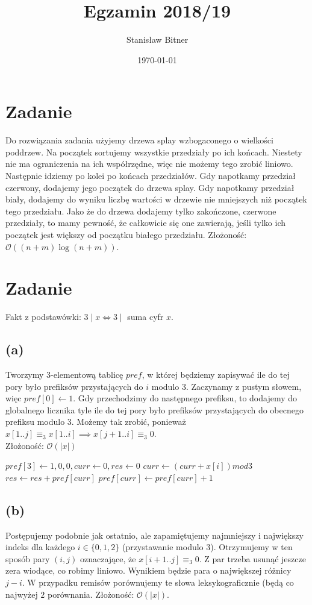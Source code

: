 \documentclass[12pt, a4paper]{article}
\title{Egzamin 2018/19}
\author{Stanisław Bitner}
\date{\today}
\newcommand{\MCALO}{\mathcal{O}}
\newcounter{zadanie}
\newcommand{\zadanie}{\addtocounter{zadanie}{1}\section*{Zadanie \arabic{zadanie}}}
\begin{document}
\maketitle
\zadanie{}
Do rozwiązania zadania użyjemy drzewa splay wzbogaconego o wielkości poddrzew.
Na początek sortujemy wszystkie przedziały po ich końcach. Niestety nie ma
ograniczenia na ich współrzędne, więc nie możemy tego zrobić liniowo. Następnie
idziemy po kolei po końcach przedziałów. Gdy napotkamy przedział czerwony,
dodajemy jego początek do drzewa splay. Gdy napotkamy przedział biały, dodajemy
do wyniku liczbę wartości w drzewie nie mniejszych niż początek tego
przedziału. Jako że do drzewa dodajemy tylko zakończone, czerwone przedziały,
to mamy pewność, że całkowicie się one zawierają, jeśli tylko ich początek jest
większy od początku białego przedziału. Złożoność: $\MCALO((n+m)\log{(n+m)})$.

\zadanie{}
Fakt z podstawówki: $3 \mid x \iff 3 \mid $ suma cyfr $x$.
\subsection*{(a)}
Tworzymy $3$-elementową tablicę $\mathit{pref}$, w której będziemy zapisywać
ile do tej pory było prefiksów przystających do $i$ modulo $3$. Zaczynamy
z pustym słowem, więc $pref[0] \gets 1$. Gdy przechodzimy do następnego
prefiksu, to dodajemy do globalnego licznika tyle ile do tej pory było
prefiksów przystających do obecnego prefiksu modulo $3$. Możemy tak zrobić,
ponieważ $x[1..j] \equiv_3 x[1..i] \implies x[j+1..i] \equiv_3 0$.\\
Złożoność: $\MCALO(|x|)$

\begin{algorithmic}

  \State $pref[3] \gets {1,0,0}, curr \gets 0, res \gets 0$
    \State $curr \gets (curr + x[i]) mod 3$
    \State $res \gets res + pref[curr]$
    \State $pref[curr] \gets pref[curr] + 1$
  \EndFor
\EndFunction

\end{algorithmic}

\subsection*{(b)}
Postępujemy podobnie jak ostatnio, ale zapamiętujemy najmniejszy i największy
indeks dla każdego $i\in\{0,1,2\}$ (przystawanie modulo $3$). Otrzymujemy
w ten sposób pary $(i,j)$ oznaczające, że $x[i+1..j] \equiv_3 0$. Z par trzeba
usunąć jeszcze zera wiodące, co robimy liniowo. Wynikiem będzie para
o największej różnicy $j-i$. W przypadku remisów porównujemy te słowa
leksykograficznie (będą co najwyżej $2$ porównania. Złożoność: $\MCALO(|x|)$.
\end{document}
